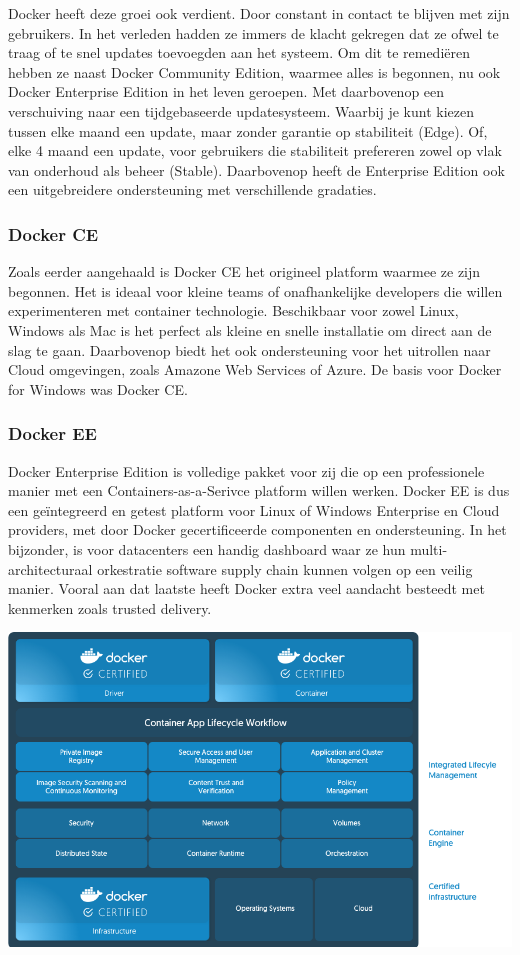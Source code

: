 Docker heeft deze groei ook verdient. Door constant in contact te blijven met zijn gebruikers. In het verleden hadden ze immers de klacht gekregen dat ze ofwel te traag of te snel updates toevoegden aan het systeem. Om dit te remediëren hebben ze naast Docker Community Edition, waarmee alles is begonnen, nu ook Docker Enterprise Edition in het leven geroepen. Met daarbovenop een verschuiving naar een tijdgebaseerde updatesysteem. Waarbij je kunt kiezen tussen elke maand een update, maar zonder garantie op stabiliteit (Edge). Of, elke 4 maand een update, voor gebruikers die stabiliteit prefereren zowel op vlak van onderhoud als beheer (Stable). Daarbovenop heeft de Enterprise Edition ook een uitgebreidere ondersteuning met verschillende gradaties. ~\autocite{EEvCE}

\subsubsection{Docker CE}
Zoals eerder aangehaald is Docker CE het origineel platform waarmee ze zijn begonnen. Het is ideaal voor kleine teams of onafhankelijke developers die willen experimenteren met container technologie. Beschikbaar voor zowel Linux, Windows als Mac is het perfect als kleine en snelle installatie om direct aan de slag te gaan. Daarbovenop biedt het ook ondersteuning voor het uitrollen naar Cloud omgevingen, zoals Amazone Web Services of Azure. De basis voor Docker for Windows was Docker CE. ~\autocite{DockerCE}

\subsubsection{Docker EE}
Docker Enterprise Edition is volledige pakket voor zij die op een professionele manier met een Containers-as-a-Serivce platform willen werken. Docker EE is dus een geïntegreerd en getest platform voor Linux of Windows Enterprise en Cloud providers, met door Docker gecertificeerde componenten en ondersteuning. In het bijzonder, is voor datacenters een handig dashboard waar ze hun multi-architecturaal orkestratie software supply chain kunnen volgen op een veilig manier. Vooral aan dat laatste heeft Docker extra veel aandacht besteedt met kenmerken zoals trusted delivery. ~\autocite{DockerEE}

\begin{center}
	\includegraphics[scale=0.2]{img/dockerce.png}
\end{center}


